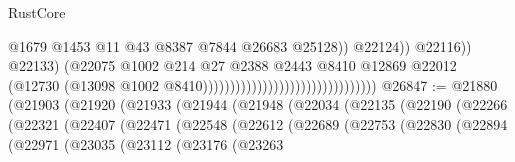 \begin{lexlean}{RustCore}
\begin{coremodule}
                                                                            @1679
                                                                            @1453
                                                                            @11
                                                                            @43
                                                                            @8387
                                                                            @7844
                                                                            @26683
                                                                            @25128))
                                                                        @22124))
                                                                    @22116))
                                                                @22133)
                                                              (@22075
                                                                @1002
                                                                @214
                                                                @27
                                                                @2388
                                                                @2443
                                                                @8410
                                                                @12869
                                                                @22012
                                                                (@12730
                                                                  (@13098
                                                                    @1002
                                                                    @8410))))))))))))))))))))))))))))))))
@26847 := @21880
    (@21903
      (@21920
        (@21933
          (@21944
            (@21948
              (@22034
                (@22135
                  (@22190
                    (@22266
                      (@22321
                        (@22407
                          (@22471
                            (@22548
                              (@22612
                                (@22689
                                  (@22753
                                    (@22830
                                      (@22894
                                        (@22971
                                          (@23035
                                            (@23112
                                              (@23176
                                                (@23263

\end{coremodule}
\end{lexlean}

